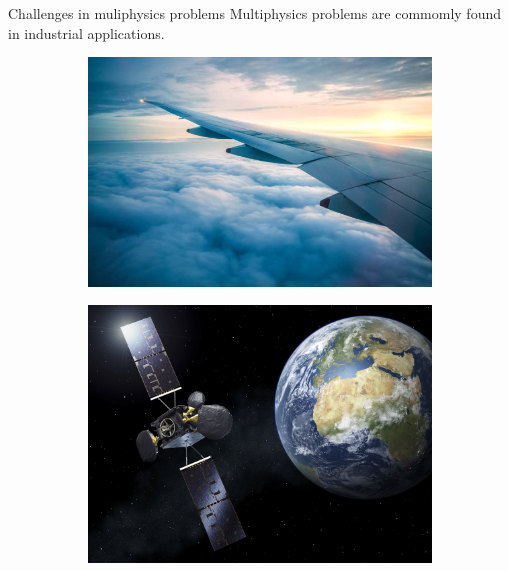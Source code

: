 \documentclass[aspectratio=169]{beamer}
\begin{document}
\begin{frame}{Challenges in muliphysics problems}
	Multiphysics problems are commomly found in industrial applications.
	\begin{figure}[t]
		\begin{subfigure}[t]{0.34\textwidth}
			\includegraphics[width=\columnwidth]{wing.jpg}\\
		\end{subfigure}\hfill
		\begin{subfigure}[t]{0.3\textwidth}
			\includegraphics[width=\columnwidth]{esa_satellite.jpg}\\
		\end{subfigure}\hfill
		\begin{subfigure}[t]{0.26\textwidth}

\end{subfigure}
\end{figure}
\end{frame}
\end{document}
